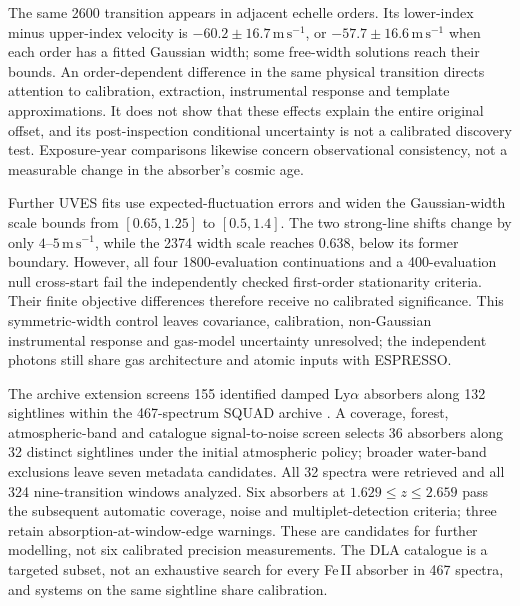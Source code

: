 The same 2600 transition appears in adjacent echelle orders. Its lower-index minus upper-index velocity is $-60.2\pm16.7\,\mathrm{m\,s^{-1}}$, or $-57.7\pm16.6\,\mathrm{m\,s^{-1}}$ when each order has a fitted Gaussian width; some free-width solutions reach their bounds. An order-dependent difference in the same physical transition directs attention to calibration, extraction, instrumental response and template approximations. It does not show that these effects explain the entire original offset, and its post-inspection conditional uncertainty is not a calibrated discovery test. Exposure-year comparisons likewise concern observational consistency, not a measurable change in the absorber's cosmic age.

Further UVES fits use expected-fluctuation errors and widen the Gaussian-width scale bounds from $[0.65,1.25]$ to $[0.5,1.4]$. The two strong-line shifts change by only $4$--$5\,\mathrm{m\,s^{-1}}$, while the 2374 width scale reaches $0.638$, below its former boundary. However, all four 1800-evaluation continuations and a 400-evaluation null cross-start fail the independently checked first-order stationarity criteria. Their finite objective differences therefore receive no calibrated significance. This symmetric-width control leaves covariance, calibration, non-Gaussian instrumental response and gas-model uncertainty unresolved; the independent photons still share gas architecture and atomic inputs with ESPRESSO.

The archive extension screens 155 identified damped Ly$\alpha$ absorbers along 132 sightlines within the 467-spectrum SQUAD archive \cite{Murphy2019SQUAD}. A coverage, forest, atmospheric-band and catalogue signal-to-noise screen selects 36 absorbers along 32 distinct sightlines under the initial atmospheric policy; broader water-band exclusions leave seven metadata candidates. All 32 spectra were retrieved and all 324 nine-transition windows analyzed. Six absorbers at $1.629\leq z\leq2.659$ pass the subsequent automatic coverage, noise and multiplet-detection criteria; three retain absorption-at-window-edge warnings. These are candidates for further modelling, not six calibrated precision measurements. The DLA catalogue is a targeted subset, not an exhaustive search for every Fe\,II absorber in 467 spectra, and systems on the same sightline share calibration.

